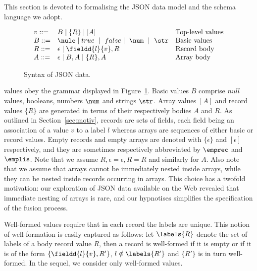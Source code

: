 This section is devoted to formalising the JSON data model and the schema language we adopt.


\begin{figure}[ht]
\[
\begin{array}{lllllll}
v ::= & B \mid \{R\} \mid [A] & \text{Top-level values}  \\
B ::=	& \nule \mid true \ \mid \ false \mid \ \num \  \mid \ \str      & \text{Basic values}\\ 
R ::= & \epsilon \mid \fieldd{l}{v} , R   & \text{Record body} \\
A ::= &  \epsilon \mid B , A \mid \{R\} , A  & \text{Array body} \\
\end{array}
\]
\caption{Syntax of JSON data.}
\label{fig:datamodel}
\end{figure}

\json\/ values obey the  grammar displayed in Figure~\ref{fig:datamodel}.
Basic values $B$ comprise  $null$ values, booleans, numbers $\num$ and strings $\str$.
Array values $[A]$ and record values $\{R\}$ are generated in terms of their respectively bodies $A$ and $R$.
As outlined in Section~\ref{sec:motiv}, records are sets of fields, each field being an association of a value $v$ to a label $l$ whereas arrays are sequences of either basic or record values.
Empty records and empty arrays are  denoted with $\{\epsilon \}$ and $[ \epsilon ]$ respectively, and they are sometimes respectively abbreviated by $\emprec$ and $\emplis$. Note that we assume $R,\epsilon = \epsilon,R=R$ and similarly for $A$. Also note that we assume that arrays cannot be immediately nested inside arrays, while they can be nested inside records occurring in arrays. This choice has a twofold motivation: our exploration of JSON data available on the Web revealed that immediate nesting of arrays is rare, and our hypnotises simplifies the specification of the fusion process.


Well-formed \json\/ values require that in each record the labels are unique.
This notion of well-formation is easily captured as follows: let $\labels{R}$ denote the set of labels of a body record value $R$, then a record is well-formed if it is empty or if it is of the form $\{\fieldd{l}{v}, R'\}$,  $l \notin \labels{R'}$ and $\{R'\}$ is in turn well-formed. In the sequel, we consider only well-formed \json\/ values.

